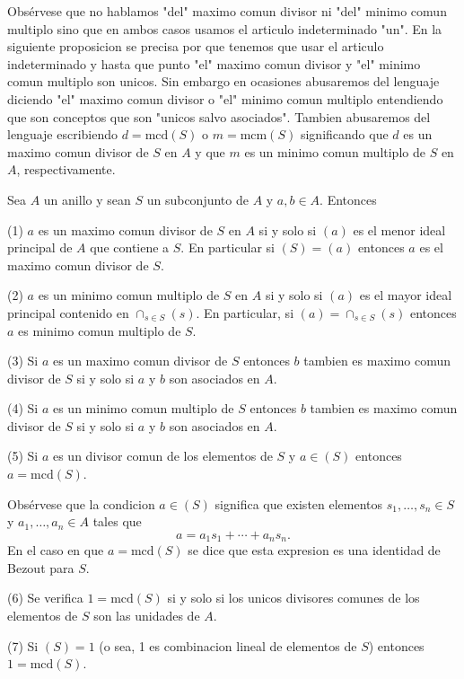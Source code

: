Obsérvese que no hablamos "del" maximo comun divisor ni "del" minimo comun multiplo sino que en ambos casos usamos el articulo indeterminado "un". En la siguiente proposicion se precisa por que tenemos que usar el articulo indeterminado y hasta que punto "el" maximo comun divisor y "el" minimo comun multiplo son unicos. Sin embargo en ocasiones abusaremos del lenguaje diciendo "el" maximo comun divisor o "el" minimo comun multiplo entendiendo que son conceptos que son "unicos salvo asociados". Tambien abusaremos del lenguaje escribiendo \(d = \mathrm{mcd}(S)\) o \(m = \mathrm{mcm}(S)\) significando que \(d\) es un maximo comun divisor de \(S\) en \(A\) y que \(m\) es un minimo comun multiplo de \(S\) en \(A\), respectivamente.

\begin{proposition}{}{}
Sea \(A\) un anillo y sean \(S\) un subconjunto de \(A\) y \(a, b \in A\). Entonces

(1) \(a\) es un maximo comun divisor de \(S\) en \(A\) si y solo si \((a)\) es el menor ideal principal de \(A\) que contiene a \(S\). En particular si \((S) = (a)\) entonces \(a\) es el maximo comun divisor de \(S\).

(2) \(a\) es un minimo comun multiplo de \(S\) en \(A\) si y solo si \((a)\) es el mayor ideal principal contenido en \(\cap_{s \in S}(s)\). En particular, si \((a) = \cap_{s \in S}(s)\) entonces \(a\) es minimo comun multiplo de \(S\).

(3) Si \(a\) es un maximo comun divisor de \(S\) entonces \(b\) tambien es maximo comun divisor de \(S\) si y solo si \(a\) y \(b\) son asociados en \(A\).

(4) Si \(a\) es un minimo comun multiplo de \(S\) entonces \(b\) tambien es maximo comun divisor de \(S\) si y solo si \(a\) y \(b\) son asociados en \(A\).

(5) Si \(a\) es un divisor comun de los elementos de \(S\) y \(a \in (S)\) entonces \(a = \mathrm{mcd}(S)\).

Obsérvese que la condicion \(a \in (S)\) significa que existen elementos \(s_1, \ldots, s_n \in S\) y \(a_1, \ldots, a_n \in A\) tales que
\[
a = a_1 s_1 + \cdots + a_n s_n. \tag{2.1}
\]
En el caso en que \(a = \mathrm{mcd}(S)\) se dice que esta expresion es una identidad de Bezout para \(S\).

(6) Se verifica \(1 = \mathrm{mcd}(S)\) si y solo si los unicos divisores comunes de los elementos de \(S\) son las unidades de \(A\).

(7) Si \((S) = 1\) (o sea, 1 es combinacion lineal de elementos de \(S\)) entonces \(1 = \mathrm{mcd}(S)\).
\end{proposition}

